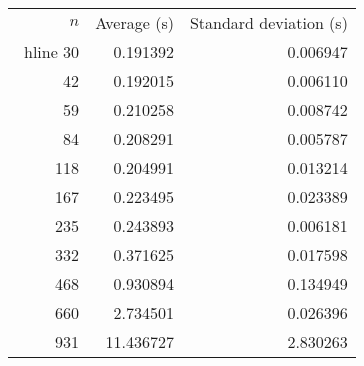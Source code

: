 \begin{tabular}{rrr}
$n$& Average (s) & Standard deviation (s)\\\ hline
30& 0.191392& 0.006947\\
42& 0.192015& 0.006110\\
59& 0.210258& 0.008742\\
84& 0.208291& 0.005787\\
118& 0.204991& 0.013214\\
167& 0.223495& 0.023389\\
235& 0.243893& 0.006181\\
332& 0.371625& 0.017598\\
468& 0.930894& 0.134949\\
660& 2.734501& 0.026396\\
931& 11.436727& 2.830263\\
\end{tabular}
